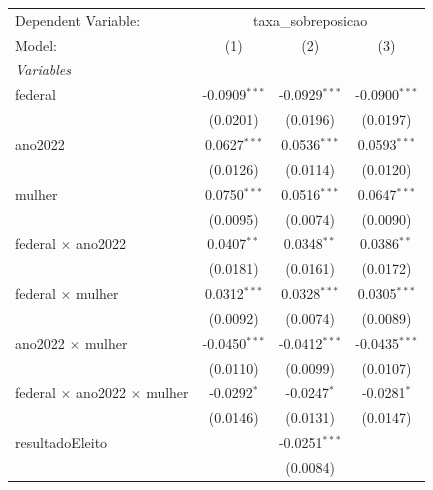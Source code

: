 
\begingroup
\centering
\begin{tabular}{lccc}
   \tabularnewline \midrule \midrule
   Dependent Variable: & \multicolumn{3}{c}{taxa\_sobreposicao}\\
   Model:                                     & (1)             & (2)             & (3)\\  
   \midrule
   \emph{Variables}\\
   federal                                    & -0.0909$^{***}$ & -0.0929$^{***}$ & -0.0900$^{***}$\\   
                                              & (0.0201)        & (0.0196)        & (0.0197)\\   
   ano2022                                    & 0.0627$^{***}$  & 0.0536$^{***}$  & 0.0593$^{***}$\\   
                                              & (0.0126)        & (0.0114)        & (0.0120)\\   
   mulher                                     & 0.0750$^{***}$  & 0.0516$^{***}$  & 0.0647$^{***}$\\   
                                              & (0.0095)        & (0.0074)        & (0.0090)\\   
   federal $\times$ ano2022                   & 0.0407$^{**}$   & 0.0348$^{**}$   & 0.0386$^{**}$\\   
                                              & (0.0181)        & (0.0161)        & (0.0172)\\   
   federal $\times$ mulher                    & 0.0312$^{***}$  & 0.0328$^{***}$  & 0.0305$^{***}$\\   
                                              & (0.0092)        & (0.0074)        & (0.0089)\\   
   ano2022 $\times$ mulher                    & -0.0450$^{***}$ & -0.0412$^{***}$ & -0.0435$^{***}$\\   
                                              & (0.0110)        & (0.0099)        & (0.0107)\\   
   federal $\times$ ano2022 $\times$ mulher   & -0.0292$^{*}$   & -0.0247$^{*}$   & -0.0281$^{*}$\\   
                                              & (0.0146)        & (0.0131)        & (0.0147)\\   
   resultadoEleito                            &                 & -0.0251$^{***}$ &   \\   
                                              &                 & (0.0084)        &   \\   

\end{tabular}
